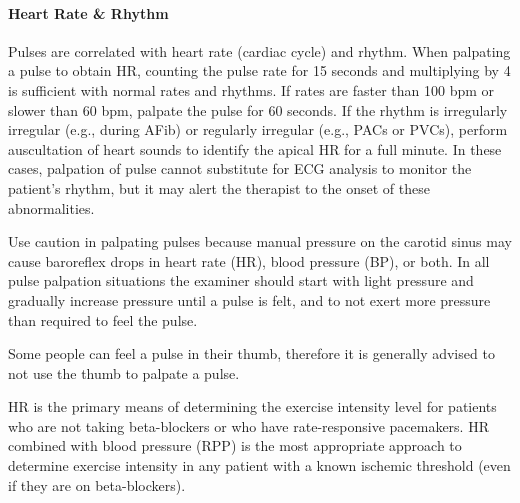 \paragraph{Heart Rate \& Rhythm}

Pulses are correlated with heart rate (cardiac cycle) and rhythm. When palpating a pulse to obtain HR, counting the pulse rate for 15 seconds and multiplying by 4 is sufficient with normal rates and rhythms. If rates are faster than 100 bpm or slower than 60 bpm, palpate the pulse for 60 seconds. If the rhythm is irregularly irregular (e.g., during AFib) or regularly irregular (e.g., PACs or PVCs), perform auscultation of heart sounds to identify the apical HR for a full minute. In these cases, palpation of pulse cannot substitute for ECG analysis to monitor the patient’s rhythm, but it may alert the therapist to the onset of these abnormalities.

Use caution in palpating pulses because manual pressure on the carotid sinus may cause baroreflex drops in heart rate (HR), blood pressure (BP), or both. In all pulse palpation situations the examiner should start with light pressure and gradually increase pressure until a pulse is felt, and to not exert more pressure than required to feel the pulse.

Some people can feel a pulse in their thumb, therefore it is generally advised to not use the thumb to palpate a pulse.

HR is the primary means of determining the exercise intensity level for patients who are not taking beta-blockers or who have rate-responsive pacemakers. HR combined with blood pressure (RPP) is the most appropriate approach to determine exercise intensity in any patient with a known ischemic threshold (even if they are on beta-blockers).

